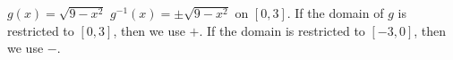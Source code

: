 {$g(x)=\sqrt{9-x^2}$}
{$g^{-1}(x)=\pm\sqrt{9-x^2}$ on $[0,3]$.  If the domain of $g$ is restricted to $[0,3]$, then we use $+$.  If the domain is restricted to $[-3,0]$, then we use $-$.}
